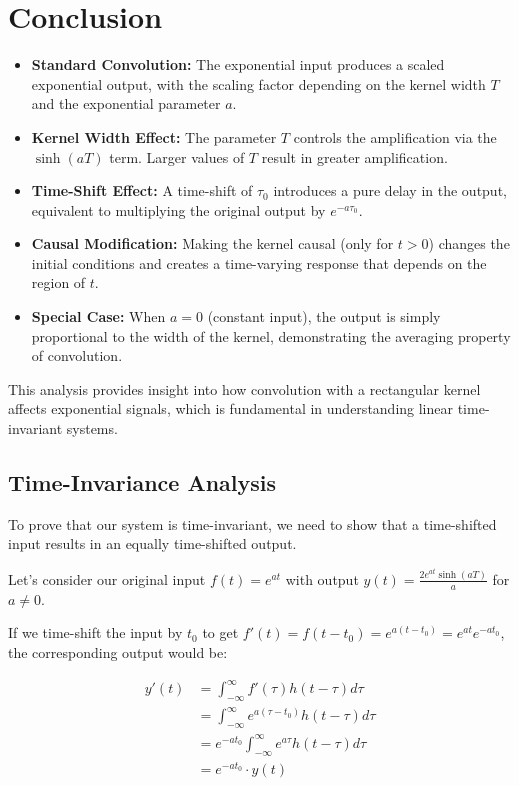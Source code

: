 \documentclass[12pt,a4paper,titlepage]{article}
\begin{document}
\section{Conclusion}
\begin{itemize}
    \item \textbf{Standard Convolution:} The exponential input produces a scaled exponential output, with the scaling factor depending on the kernel width $T$ and the exponential parameter $a$.
    
    \item \textbf{Kernel Width Effect:} The parameter $T$ controls the amplification via the $\sinh(aT)$ term. Larger values of $T$ result in greater amplification.
    
    \item \textbf{Time-Shift Effect:} A time-shift of $\tau_0$ introduces a pure delay in the output, equivalent to multiplying the original output by $e^{-a\tau_0}$.
    
    \item \textbf{Causal Modification:} Making the kernel causal (only for $t > 0$) changes the initial conditions and creates a time-varying response that depends on the region of $t$.
    
    \item \textbf{Special Case:} When $a = 0$ (constant input), the output is simply proportional to the width of the kernel, demonstrating the averaging property of convolution.
\end{itemize}

This analysis provides insight into how convolution with a rectangular kernel affects exponential signals, which is fundamental in understanding linear time-invariant systems.
\subsection{Time-Invariance Analysis}
To prove that our system is time-invariant, we need to show that a time-shifted input results in an equally time-shifted output. 

Let's consider our original input $f(t) = e^{at}$ with output $y(t) = \frac{2e^{at}\sinh(aT)}{a}$ for $a \neq 0$.

If we time-shift the input by $t_0$ to get $f'(t) = f(t-t_0) = e^{a(t-t_0)} = e^{at}e^{-at_0}$, the corresponding output would be:

\begin{align}
y'(t) &= \int_{-\infty}^{\infty} f'(\tau)h(t-\tau)d\tau \\
&= \int_{-\infty}^{\infty} e^{a(\tau-t_0)}h(t-\tau)d\tau \\
&= e^{-at_0}\int_{-\infty}^{\infty} e^{a\tau}h(t-\tau)d\tau \\
&= e^{-at_0} \cdot y(t)
\end{align}
\end{document}
